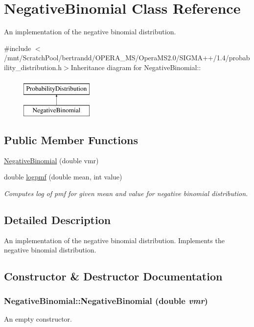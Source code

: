 \hypertarget{classNegativeBinomial}{
\section{NegativeBinomial Class Reference}
\label{classNegativeBinomial}
}


An implementation of the negative binomial distribution.  


{\ttfamily \#include $<$/mnt/ScratchPool/bertrandd/OPERA\_\-MS/OperaMS2.0/SIGMA++/1.4/probability\_\-distribution.h$>$}Inheritance diagram for NegativeBinomial::\begin{figure}[H]
\begin{center}
\leavevmode
\includegraphics[height=2cm]{classNegativeBinomial}
\end{center}
\end{figure}
\subsection*{Public Member Functions}
\begin{DoxyCompactItemize}
\item 
\hyperlink{classNegativeBinomial_a71bf3d7a1834723d6854f08ccbabaa22}{NegativeBinomial} (double vmr)
\item 
double \hyperlink{classNegativeBinomial_a5ad5901d26f1797cbe52e9569b312c5d}{logpmf} (double mean, int value)
\begin{DoxyCompactList}\small\item\em Computes log of pmf for given mean and value for negative binomial distribution. \item\end{DoxyCompactList}\end{DoxyCompactItemize}


\subsection{Detailed Description}
An implementation of the negative binomial distribution. Implements the negative binomial distribution. 

\subsection{Constructor \& Destructor Documentation}
\hypertarget{classNegativeBinomial_a71bf3d7a1834723d6854f08ccbabaa22}{
\subsubsection[{NegativeBinomial}]{\setlength{\rightskip}{0pt plus 5cm}NegativeBinomial::NegativeBinomial (double {\em vmr})}}
\label{classNegativeBinomial_a71bf3d7a1834723d6854f08ccbabaa22}
An empty constructor. 

